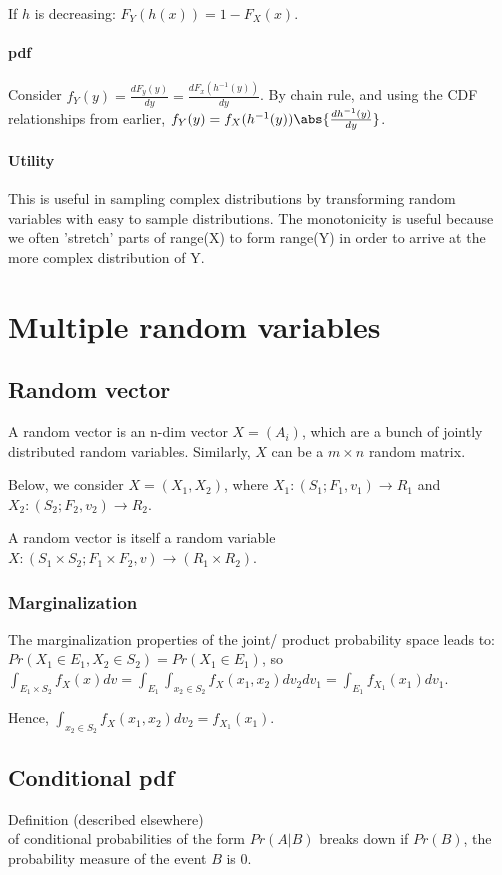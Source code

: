 \documentclass[oneside, article]{memoir}
\begin{document}
If $h$ is decreasing: $F_Y(h(x)) = 1 - F_X(x)$.

\subsubsection{pdf}
Consider $f_Y(y) = \frac{dF_y(y)}{dy} = \frac{dF_x(h^{-1}(y))}{dy}$. By chain rule, and using the CDF relationships from earlier, $f_Y(y) = f_X(h^{-1}(y)) \abs{\frac{dh^{-1}(y)}{dy}}$.

\subsubsection{Utility}
This is useful in sampling complex distributions by transforming random variables with easy to sample distributions. The monotonicity is useful because we often 'stretch' parts of range(X) to form range(Y) in order to arrive at the more complex distribution of Y.

\chapter{Multiple random variables}
\section{Random vector}
A random vector is an n-dim vector $X = (A_{i})$, which are a bunch of jointly distributed random variables. Similarly, $X$ can be a $m \times n$ random matrix.

Below, we consider $X = (X_1, X_2)$, where $X_1:(S_1; F_1, v_1) \to R_1$ and $X_2:(S_2; F_2, v_2) \to R_2$.

A random vector is itself a random variable $X:(S_1 \times S_2; F_1 \times F_2, v) \to (R_1 \times R_2)$.

\subsection{Marginalization}
The marginalization properties of the joint/ product probability space leads to: $Pr(X_1 \in E_1, X_2 \in S_2) = Pr(X_1 \in E_1)$, so \\$\int_{E_1 \times S_2} f_X(x) dv = \int_{E_1} \int_{x_2 \in S_2} f_{X}(x_1, x_2) dv_2 dv_1 = \int_{E_1} f_{X_1}(x_1)dv_1$.

Hence, $\int_{x_2 \in S_2} f_{X}(x_1, x_2) dv_2 = f_{X_1}(x_1)$.

\section{Conditional pdf}
Definition (described elsewhere) \\of conditional probabilities of the form $Pr(A|B)$ breaks down if $Pr(B)$, the probability measure of the event $B$ is 0.
\end{document}
